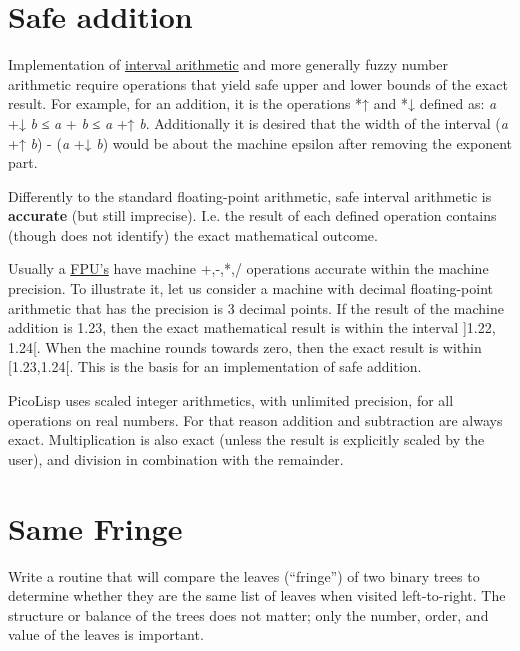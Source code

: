 \pagebreak{}
\section*{Safe addition}

Implementation of
\href{http://en.wikipedia.org/wiki/Interval\_arithmetic}{interval
  arithmetic} and more generally fuzzy number arithmetic require
operations that yield safe upper and lower bounds of the exact result.
For example, for an addition, it is the operations *↑ and *↓ defined
as: \emph{a} +↓ \emph{b} ≤ \emph{a} + \emph{b} ≤ \emph{a} +↑ \emph{b}.
Additionally it is desired that the width of the interval (\emph{a} +↑
\emph{b}) - (\emph{a} +↓ \emph{b}) would be about the machine epsilon
after removing the exponent part.

Differently to the standard floating-point arithmetic, safe interval
arithmetic is \textbf{accurate} (but still imprecise). I.e. the result
of each defined operation contains (though does not identify) the exact
mathematical outcome.

Usually a
\href{http://en.wikipedia.org/wiki/Floating\_Point\_Unit}{FPU's} have
machine +,-,*,/ operations accurate within the machine precision. To
illustrate it, let us consider a machine with decimal floating-point
arithmetic that has the precision is 3 decimal points. If the result of
the machine addition is 1.23, then the exact mathematical result is
within the interval {]}1.22, 1.24{[}. When the machine rounds towards
zero, then the exact result is within {[}1.23,1.24{[}. This is the basis
for an implementation of safe addition.

\begin{wideverbatim}

PicoLisp uses scaled integer arithmetics, with unlimited precision, for all
operations on real numbers. For that reason addition and subtraction are always
exact. Multiplication is also exact (unless the result is explicitly scaled by
the user), and division in combination with the remainder.

\end{wideverbatim}

\pagebreak{}
\section*{Same Fringe}

Write a routine that will compare the leaves (``fringe'') of two binary
trees to determine whether they are the same list of leaves when visited
left-to-right. The structure or balance of the trees does not matter;
only the number, order, and value of the leaves is important.

